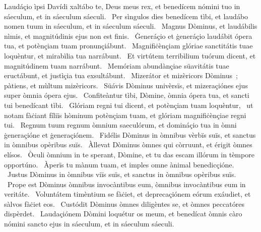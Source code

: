 { Laudáçio ìpsi Davídi}
{%
xaltábo te, Deus meus rex, et benedícem nómini tuo in sáeculum, et in sáeculum sáeculi. 
~Per sìngulos dies benedícem tìbi, et laudábo nomen tuum in sáeculum, et in sáeculum sáeculi. 
~Magnus Dòminus, et laudábilis nìmis, et magnitúdinis ejus non est finis. 
~Ġeneráçio et ġeneráçio laudábit ópera tua, et potènçiam tuam pronunçiábunt. 
~Magnifiċènçiam glóriae sanctitátis tuae loquèntur, et mirabìlia tua narrábunt. 
~Et virtútem terribìlium tuórum dicent, et magnitúdinem tuam narrábunt. 
~Memóriam abundànçiae süavitátis tuae eructábunt, et justìçia tua exsultábunt. 
~Mizerátor et mizèricors Dòminus~; pàtiens, et mùltum mizèricors. 
~Süávis Dòminus univèrsïs, et mizeraçiónes ejus super òmnia ópera ejus. 
~Confiteàntur tìbi, Dòmine, òmnia ópera tua, et sancti tui benedícant tìbi. 
~Glóriam regni tui dicent, et potènçiam tuam loquèntur, 
~ut notam fàċiant fíliïs hòminum potènçiam tuam, et glóriam magnifiċènçiae regni tui. 
~Regnum tuum regnum òmnium saeculórum, et domináçio tua in òmni ġeneraçióne et ġeneraçiónem. 
~Fidélis Dòminus in òmnibus vèrbïs suïs, et sanctus in òmnibus opèribus suïs. 
~Àllevat Dòminus òmnes qui còrruunt, et érigit òmnes elísos. 
~Òculi òmnium in te sperant, Dòmine, et tu das escam illórum in tèmpore opportúno. 
~Àperïs tu mànum tuam, et imples omne ànimal benedicçióne. 
~Justus Dòminus in òmnibus viïs suïs, et sanctus in òmnibus opèribus suïs. 
~Prope est Dòminus òmnibus invocàntibus eum, òmnibus invocàntibus eum in veritáte. 
~Voluntátem timèntium se fàċiet, et deprecaçiónem eórum exáudiet, et sàlvos fàċiet eos. 
~Custódit Dòminus òmnes diligèntes se, et òmnes peccatóres dispèrdet. 
~Laudaçiónem Dòmini loquétur os meum, et benedícat òmnis càro nómini sancto ejus in sáeculum, et in sáeculum sáeculi. 
}
